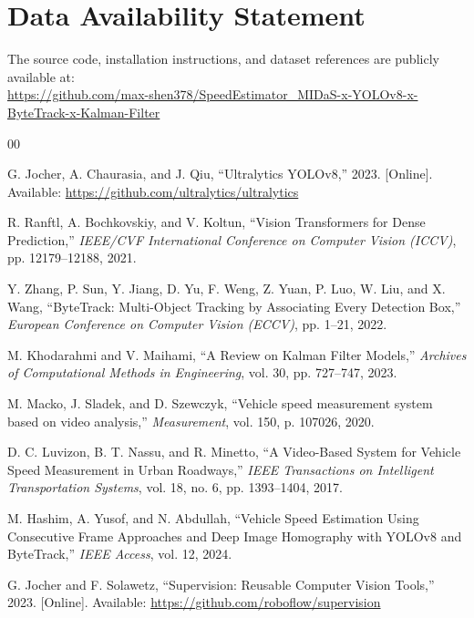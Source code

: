 \documentclass[conference]{IEEEtran}
\begin{document}
\section*{Data Availability Statement}
The source code, installation instructions, and dataset
references are publicly available at:\\
\url{https://github.com/max-shen378/SpeedEstimator_MIDaS-x-YOLOv8-x-ByteTrack-x-Kalman-Filter}

\begin{thebibliography}{00}

G. Jocher, A. Chaurasia, and J. Qiu,
``Ultralytics YOLOv8,'' 2023.
[Online]. Available: \url{https://github.com/ultralytics/ultralytics}

R. Ranftl, A. Bochkovskiy, and V. Koltun,
``Vision Transformers for Dense Prediction,''
\textit{IEEE/CVF International Conference on Computer Vision (ICCV)},
pp. 12179--12188, 2021.

Y. Zhang, P. Sun, Y. Jiang, D. Yu, F. Weng, Z. Yuan,
P. Luo, W. Liu, and X. Wang,
``ByteTrack: Multi-Object Tracking by Associating Every
Detection Box,''
\textit{European Conference on Computer Vision (ECCV)},
pp. 1--21, 2022.

M. Khodarahmi and V. Maihami,
``A Review on Kalman Filter Models,''
\textit{Archives of Computational Methods in Engineering},
vol. 30, pp. 727--747, 2023.

M. Macko, J. Sladek, and D. Szewczyk,
``Vehicle speed measurement system based on video analysis,''
\textit{Measurement}, vol. 150, p. 107026, 2020.

D. C. Luvizon, B. T. Nassu, and R. Minetto,
``A Video-Based System for Vehicle Speed Measurement in
Urban Roadways,''
\textit{IEEE Transactions on Intelligent Transportation
Systems}, vol. 18, no. 6, pp. 1393--1404, 2017.

M. Hashim, A. Yusof, and N. Abdullah,
``Vehicle Speed Estimation Using Consecutive Frame Approaches
and Deep Image Homography with YOLOv8 and ByteTrack,''
\textit{IEEE Access}, vol. 12, 2024.

G. Jocher and F. Solawetz,
``Supervision: Reusable Computer Vision Tools,'' 2023.
[Online]. Available: \url{https://github.com/roboflow/supervision}


\end{thebibliography}
\end{document}
